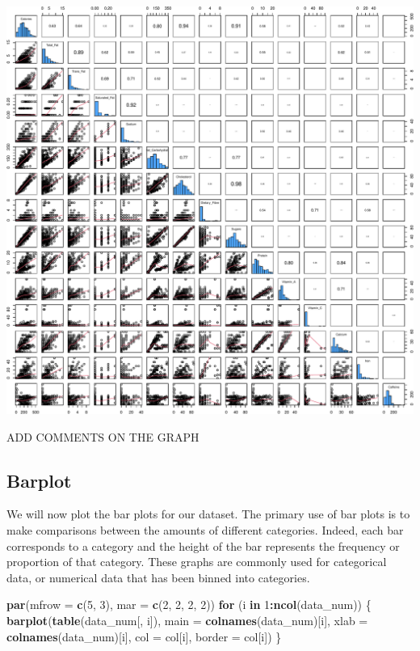 \documentclass[
]{article}
\newenvironment{Shaded}{\begin{snugshade}}{\end{snugshade}}
\newcommand{\AttributeTok}[1]{\textcolor[rgb]{0.13,0.29,0.53}{#1}}
\newcommand{\ControlFlowTok}[1]{\textcolor[rgb]{0.13,0.29,0.53}{\textbf{#1}}}
\newcommand{\DecValTok}[1]{\textcolor[rgb]{0.00,0.00,0.81}{#1}}
\newcommand{\FunctionTok}[1]{\textcolor[rgb]{0.13,0.29,0.53}{\textbf{#1}}}
\newcommand{\NormalTok}[1]{#1}
\newcommand{\SpecialCharTok}[1]{\textcolor[rgb]{0.81,0.36,0.00}{\textbf{#1}}}
\begin{document}
\begin{center}\includegraphics{Statistical_Learning_Final_Report_files/figure-latex/pairplot-1} \end{center}

ADD COMMENTS ON THE GRAPH

\subsection{Barplot}\label{barplot}

We will now plot the bar plots for our dataset. The primary use of bar
plots is to make comparisons between the amounts of different
categories. Indeed, each bar corresponds to a category and the height of
the bar represents the frequency or proportion of that category. These
graphs are commonly used for categorical data, or numerical data that
has been binned into categories.

\begin{Shaded}
\begin{Highlighting}[]
\FunctionTok{par}\NormalTok{(}\AttributeTok{mfrow =} \FunctionTok{c}\NormalTok{(}\DecValTok{5}\NormalTok{, }\DecValTok{3}\NormalTok{), }\AttributeTok{mar =} \FunctionTok{c}\NormalTok{(}\DecValTok{2}\NormalTok{, }\DecValTok{2}\NormalTok{, }\DecValTok{2}\NormalTok{, }\DecValTok{2}\NormalTok{))}
\ControlFlowTok{for}\NormalTok{ (i }\ControlFlowTok{in} \DecValTok{1}\SpecialCharTok{:}\FunctionTok{ncol}\NormalTok{(data\_num)) \{}
  \FunctionTok{barplot}\NormalTok{(}\FunctionTok{table}\NormalTok{(data\_num[, i]), }\AttributeTok{main =} \FunctionTok{colnames}\NormalTok{(data\_num)[i],}
          \AttributeTok{xlab =} \FunctionTok{colnames}\NormalTok{(data\_num)[i], }\AttributeTok{col =}\NormalTok{ col[i], }\AttributeTok{border =}\NormalTok{ col[i])}
\NormalTok{\}}
\end{Highlighting}
\end{Shaded}
\end{document}
